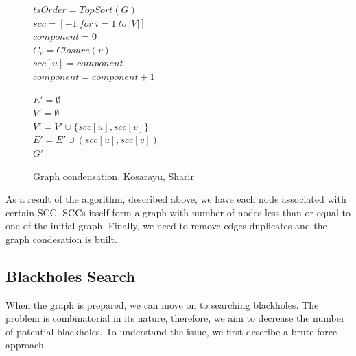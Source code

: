 \documentclass{svproc}
\begin{document}
\begin{figure}[H]
	\begin{center}
		\begin{algorithm}[H]
			\SetAlgoLined
                        $tsOrder = TopSort(G)$ \\
                        $scc = [-1\ for\ i = 1\ to\ |V|] $ \\ 
                        $component = 0$ \\
                         {
                             {
                                $C_v = Closure(v)$ \\
                                 {
                                    $scc[u] = component$ \\
                                }
                                $component = component + 1$ \\
                            }
                        }

                        $E' = \emptyset$ \\
                        $V' = \emptyset$ \\
                         {
                             {
                               $V' = V' \cup \{scc[u], scc[v]\}$ \\ 
                               $E' = E' \cup (scc[u], scc[v])$ \\ 
                            }
                        }
                        \Return $G'$
			\label{alg:condensation}
			\caption{Graph condensation. Kosarayu, Sharir}
		\end{algorithm}
	\end{center}
\end{figure}

As a result of the algorithm, described above, we have each node associated with certain SCC.
SCCs itself form a graph with number of nodes less than or equal to one of the initial graph.
Finally, we need to remove edges duplicates and the graph condesation is built.

%

%
\subsection{Blackholes Search}
When the graph is prepared, we can move on to searching blackholes. The problem is combinatorial in its nature, therefore, we aim to
decrease the number of potential blackholes.
To understand the issue, we first describe a brute-force approach. 
\end{document}
